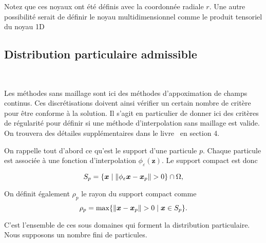 Notez que ces noyaux ont été définis avec la coordonnée radiale $r$. Une autre possibilité serait de définir le noyau multidimensionnel comme le produit tensoriel du noyau 1D

\subsection{Distribution particulaire admissible}~\label{sec:part_admissible}

Les méthodes sans maillage sont ici des méthodes d'appoximation de champs continus. Ces discrétisations doivent ainsi vérifier un certain nombre de critère pour être conforme à la solution. Il s'agit en particulier de donner ici des critères de régularité pour définir si une méthode d'interpolation sans maillage est valide. On trouvera des détailes supplémentaires dans le livre~\cite{s_li_meshfree_2004} en section 4.

On rappelle tout d'abord ce qu'est le support d'une particule $p$. Chaque particule est associée à une fonction d'interpolation $\phi_\varepsilon(\bm{z})$. Le support compact est donc

\begin{equation*}
    S_p = \{\bm{x} \mid \| \phi_\varepsilon \bm{x} - \bm{x}_p \| > 0\} \cap \Omega,
\end{equation*}

On définit également $\rho_p$ le rayon du support compact comme
\begin{equation*}
    \rho_p =  \max \{\| \bm{x} - \bm{x}_p \| > 0 \mid \bm{x} \in S_p\}.
\end{equation*}

C'est l'ensemble de ces sous domaines qui forment la distribution particulaire. Nous supposons un nombre fini de particules. %

